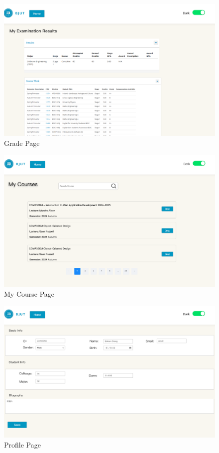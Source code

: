 \documentclass[12pt]{article}
\begin{document}
\begin{figure}[H]
    \centering
    \includegraphics[width=\textwidth]{mockups/student/grade.png}
    \caption{Grade Page}
    \label{fig:grade_page}
\end{figure}

\begin{figure}[H]
    \centering
    \includegraphics[width=\textwidth]{mockups/student/mycourse.png}
    \caption{My Course Page}
    \label{fig:mycourse_page}
\end{figure}

\begin{figure}[H]
    \centering
    \includegraphics[width=\textwidth]{mockups/student/profile.png}
    \caption{Profile Page}
    \label{fig:student_profile_page}
\end{figure}
\end{document}
